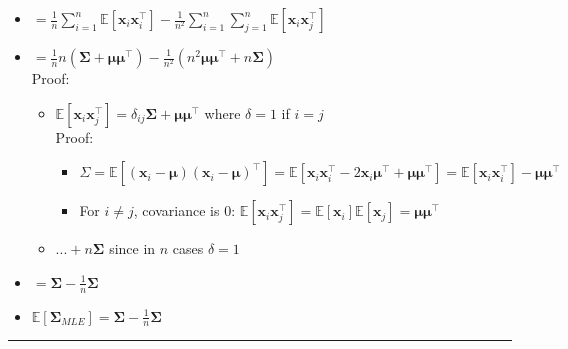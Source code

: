 \begin{itemize}
\begin{itemize}
        \item $= \frac{1}{n} \sum_{i=1}^n \mathbb{E}\left[\boldsymbol{x}_i \boldsymbol{x}_i^\intercal\right] - \frac{1}{n^2} \sum_{i=1}^n \sum_{j=1}^n \mathbb{E}\left[\boldsymbol{x}_i \boldsymbol{x}_j^\intercal\right]$
        \item $= \frac{1}{n} n \left(\boldsymbol{\Sigma} + \boldsymbol{\mu}\boldsymbol{\mu}^\intercal\right) - \frac{1}{n^2} \left(n^2 \boldsymbol{\mu}\boldsymbol{\mu}^\intercal + n\boldsymbol{\Sigma}\right)$\\
        Proof:
        \begin{itemize}
            \item $\mathbb{E}\left[\boldsymbol{x}_i \boldsymbol{x}_j^\intercal\right] = \delta_{ij} \boldsymbol{\Sigma} + \boldsymbol{\mu}\boldsymbol{\mu}^\intercal$ where $\delta = 1$ if $i = j$\\
            Proof:\\
            \begin{itemize}
                \item $\Sigma = \mathbb{E}\left[\left(\boldsymbol{x}_i - \boldsymbol{\mu}\right)\left(\boldsymbol{x}_i - \boldsymbol{\mu}\right)^\intercal\right] 
                = \mathbb{E}\left[\boldsymbol{x}_i \boldsymbol{x}_i^\intercal - 2\boldsymbol{x}_i \boldsymbol{\mu}^\intercal + \boldsymbol{\mu}\boldsymbol{\mu}^\intercal\right] 
                = \mathbb{E}\left[\boldsymbol{x}_i \boldsymbol{x}_i^\intercal\right] - \boldsymbol{\mu}\boldsymbol{\mu}^\intercal$
                \item For $i \neq j$, covariance is $0$: 
                $\mathbb{E}\left[\boldsymbol{x}_i \boldsymbol{x}_j^\intercal\right] = \mathbb{E}[\boldsymbol{x}_i]\mathbb{E}[\boldsymbol{x}_j] = \boldsymbol{\mu}\boldsymbol{\mu}^\intercal$
            \end{itemize}
            \item $...+ n\boldsymbol{\Sigma}$ since in $n$ cases $\delta = 1$
        \end{itemize}
        \item $= \boldsymbol{\Sigma} - \frac{1}{n} \boldsymbol{\Sigma}$
        \item $\mathbb{E}[\boldsymbol{\Sigma}_{MLE}] = \boldsymbol{\Sigma} - \frac{1}{n} \boldsymbol{\Sigma}$
    \end{itemize}
\end{itemize}

{\color{lightgray}\hrule height 0.001mm}

